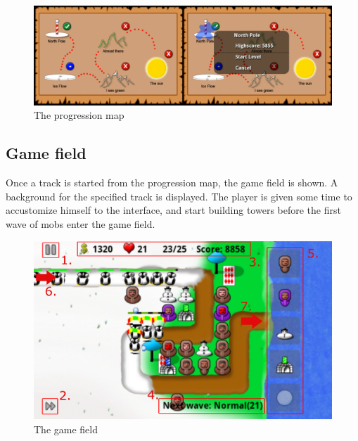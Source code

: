 \begin{figure}[here]

\begin{center}
\includegraphics[scale=0.4]{pics/chapters/chapter4/progmapboth}
\end{center}

\caption{The progression map}
\label{fig:progressionMap}

\end{figure}
\subsection{Game field}

Once a track is started from the progression map, the game field is shown. A background for the specified track is displayed. The player is given some time to accustomize himself to the interface, and start building towers before the first wave of mobs enter the game field.

\begin{figure}[here]

\begin{center}
\includegraphics[scale=0.5]{pics/chapters/chapter4/thegame}
\end{center}

\caption{The game field}
\label{fig:gameField}

\end{figure}

